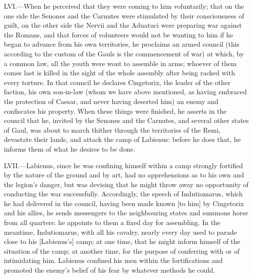 LVI.—When he perceived that they were coming to him voluntarily; that
on the one side the Senones and the Carnutes were stimulated by their
consciousness of guilt, on the other side the Nervii and the Aduatuci
were preparing war against the Romans, and that forces of volunteers
would not be wanting to him if he began to advance from his own
territories, he proclaims an armed council (this according to the custom
of the Gauls is the commencement of war) at which, by a common law, all
the youth were wont to assemble in arms; whoever of them comes last is
killed in the sight of the whole assembly after being racked with every
torture. In that council he declares Cingetorix, the leader of the other
faction, his own son-in-law (whom we have above mentioned, as having
embraced the protection of Caesar, and never having deserted him) an
enemy and confiscates his property. When these things were finished, he
asserts in the council that he, invited by the Senones and the Carnutes,
and several other states of Gaul, was about to march thither through the
territories of the Remi, devastate their lands, and attack the camp of
Labienus: before he does that, he informs them of what he desires to be
done.

LVII.—Labienus, since he was confining himself within a camp strongly
fortified by the nature of the ground and by art, had no apprehensions
as to his own and the legion's danger, but was devising that he might
throw away no opportunity of conducting the war successfully.
Accordingly, the speech of Indutiomarus, which he had delivered in the
council, having been made known [to him] by Cingetorix and his allies,
he sends messengers to the neighbouring states and summons horse from
all quarters: he appoints to them a fixed day for assembling. In the
meantime, Indutiomarus, with all his cavalry, nearly every day used to
parade close to his [Labienus's] camp; at one time, that he might inform
himself of the situation of the camp; at another time, for the purpose
of conferring with or of intimidating him. Labienus confined his men
within the fortifications and promoted the enemy's belief of his fear by
whatever methods he could.

